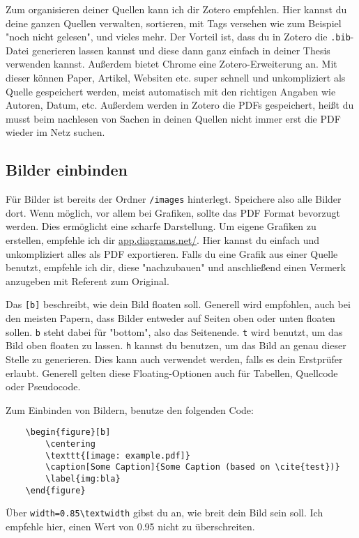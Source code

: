 Zum organisieren deiner Quellen kann ich dir Zotero empfehlen.
Hier kannst du deine ganzen Quellen verwalten, sortieren, mit Tags versehen wie zum Beispiel "noch nicht gelesen", und vieles mehr.
Der Vorteil ist, dass du in Zotero die \verb|.bib|-Datei generieren lassen kannst und diese dann ganz einfach in deiner Thesis verwenden kannst.
Außerdem bietet Chrome eine Zotero-Erweiterung an.
Mit dieser können Paper, Artikel, Websiten etc. super schnell und unkompliziert als Quelle gespeichert werden, meist automatisch mit den richtigen Angaben wie Autoren, Datum, etc.
Außerdem werden in Zotero die PDFs gespeichert, heißt du musst beim nachlesen von Sachen in deinen Quellen nicht immer erst die PDF wieder im Netz suchen.



\subsection{Bilder einbinden}
Für Bilder ist bereits der Ordner \verb|/images| hinterlegt.
Speichere also alle Bilder dort.
Wenn möglich, vor allem bei Grafiken, sollte das PDF Format bevorzugt werden.
Dies ermöglicht eine scharfe Darstellung.
Um eigene Grafiken zu erstellen, empfehle ich dir \href{https://app.diagrams.net/}{app.diagrams.net/}.
Hier kannst du einfach und unkompliziert alles als PDF exportieren.
Falls du eine Grafik aus einer Quelle benutzt, empfehle ich dir, diese "nachzubauen" und anschließend einen Vermerk anzugeben mit Referent zum Original.

Das \verb|[b]| beschreibt, wie dein Bild floaten soll.
Generell wird empfohlen, auch bei den meisten Papern, dass Bilder entweder auf Seiten oben oder unten floaten sollen.
\verb|b| steht dabei für "bottom", also das Seitenende.
\verb|t| wird benutzt, um das Bild oben floaten zu lassen.
\verb|h| kannst du benutzen, um das Bild an genau dieser Stelle zu generieren.
Dies kann auch verwendet werden, falls es dein Erstprüfer erlaubt.
Generell gelten diese Floating-Optionen auch für Tabellen, Quellcode oder Pseudocode.

Zum Einbinden von Bildern, benutze den folgenden Code:
\begin{verbatim}
    \begin{figure}[b]
        \centering
        \texttt{[image: example.pdf]}
        \caption[Some Caption]{Some Caption (based on \cite{test})}
        \label{img:bla}
    \end{figure}
\end{verbatim}\noindent
Über \verb|width=0.85\textwidth| gibst du an, wie breit dein Bild sein soll.
Ich empfehle hier, einen Wert von 0.95 nicht zu überschreiten.

